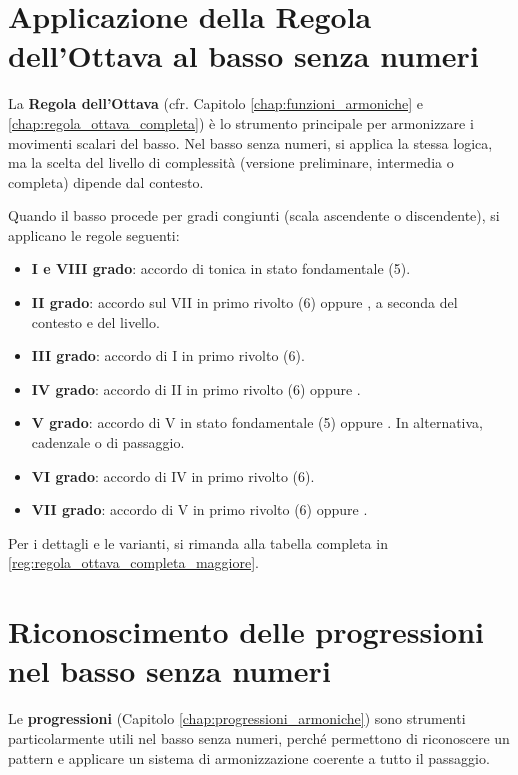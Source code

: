 \section{Applicazione della Regola dell'Ottava al basso senza numeri}
\label{sec:regola_ottava_basso_senza_numeri}

La \textbf{Regola dell'Ottava} (cfr. Capitolo \ref{chap:funzioni_armoniche} e \ref{chap:regola_ottava_completa}) è lo strumento principale per armonizzare i movimenti scalari del basso. Nel basso senza numeri, si applica la stessa logica, ma la scelta del livello di complessità (versione preliminare, intermedia o completa) dipende dal contesto.

\begin{regola}
	\label{reg:applicazione_regola_ottava_basso}
	Quando il basso procede per gradi congiunti (scala ascendente o discendente), si applicano le regole seguenti:
	\begin{itemize}
		\item \textbf{I e VIII grado}: accordo di tonica in stato fondamentale (5).
		\item \textbf{II grado}: accordo sul VII in primo rivolto (6) oppure , a seconda del contesto e del livello.
		\item \textbf{III grado}: accordo di I in primo rivolto (6).
		\item \textbf{IV grado}: accordo di II in primo rivolto (6) oppure .
		\item \textbf{V grado}: accordo di V in stato fondamentale (5) oppure . In alternativa,  cadenzale o di passaggio.
		\item \textbf{VI grado}: accordo di IV in primo rivolto (6).
		\item \textbf{VII grado}: accordo di V in primo rivolto (6) oppure .
	\end{itemize}
	Per i dettagli e le varianti, si rimanda alla tabella completa in \ref{reg:regola_ottava_completa_maggiore}.
\end{regola}

\section{Riconoscimento delle progressioni nel basso senza numeri}
\label{sec:progressioni_basso_senza_numeri}

Le \textbf{progressioni} (Capitolo \ref{chap:progressioni_armoniche}) sono strumenti particolarmente utili nel basso senza numeri, perché permettono di riconoscere un pattern e applicare un sistema di armonizzazione coerente a tutto il passaggio.

